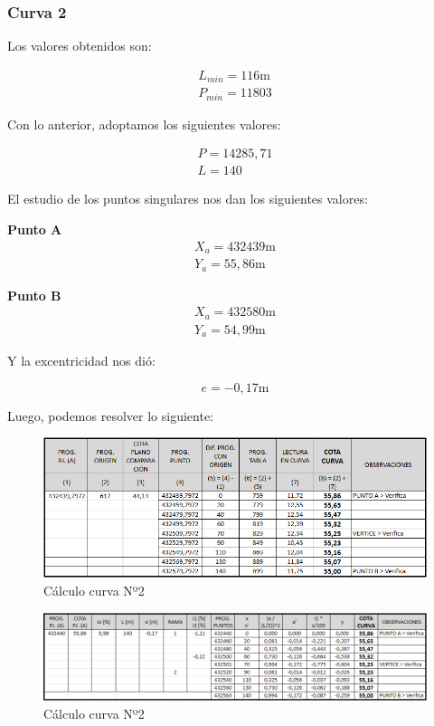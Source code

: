 \documentclass[../main.tex]{subfiles}
\begin{document}
\subsubsection{Curva 2}
Los valores obtenidos son:

\begin{align*}
    L_{min} = 116 \text{m} \\
    P_{min} = 11803
\end{align*}

Con lo anterior, adoptamos los siguientes valores:

\begin{align*}
    P = 14285,71 \\
    L = 140
\end{align*}

El estudio de los puntos singulares nos dan los siguientes valores:

\textbf{Punto A}
\begin{align*}
    X_a = 432439 \text{m} \\
    Y_a = 55,86 \text{m}
\end{align*}

\textbf{Punto B}
\begin{align*}
    X_a = 432580 \text{m} \\
    Y_a = 54,99 \text{m}
\end{align*}

Y la excentricidad nos dió:

\begin{equation*}
    e = -0,17 \text{m}
\end{equation*}

Luego, podemos resolver lo siguiente:

\begin{figure}[h]
    \centering
    \includegraphics[width=\textwidth]{images/google_sheets/Screenshot_12.png}
    \caption{Cálculo curva Nº2}
    \label{fig:curva2-1}
\end{figure}

\begin{figure}[h]
    \centering
    \includegraphics[width=\textwidth]{images/google_sheets/Screenshot_13.png}
    \caption{Cálculo curva Nº2}
    \label{fig:curva2-2}
\end{figure}
\end{document}
